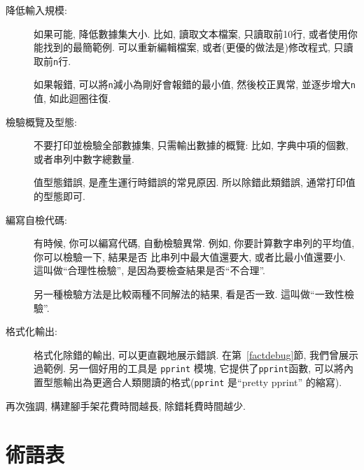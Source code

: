 \documentclass[10pt]{book}
\begin{document}
\begin{description}

\item[降低輸入規模:] 如果可能, 降低數據集大小. 比如, 讀取文本檔案, 
只讀取前10行, 或者使用你能找到的最簡範例. 
可以重新編輯檔案, 或者(更優的做法是)修改程式, 只讀取前{\tt n}行. 

如果報錯, 可以將{\tt n}減小為剛好會報錯的最小值, 
然後校正異常, 並逐步增大{\tt n}值, 如此迴圈往復. 

\item[檢驗概覽及型態:] 不要打印並檢驗全部數據集, 只需輸出數據的概覽:
比如, 字典中項的個數, 或者串列中數字總數量. 

值型態錯誤, 是產生運行時錯誤的常見原因. 
所以除錯此類錯誤, 通常打印值的型態即可. 

\item[編寫自檢代碼:]  有時候, 你可以編寫代碼, 自動檢驗異常. 
例如, 你要計算數字串列的平均值, 你可以檢驗一下, 結果是否
比串列中最大值還要大, 或者比最小值還要小. 這叫做``合理性檢驗'', 
是因為要檢查結果是否``不合理''.  

另一種檢驗方法是比較兩種不同解法的結果, 看是否一致. 
這叫做``一致性檢驗''. 

\item[格式化輸出:] 格式化除錯的輸出, 可以更直觀地展示錯誤. 
在第~\ref{factdebug}節, 我們曾展示過範例. 另一個好用的工具是 {\tt pprint} 模塊, 
它提供了{\tt pprint}函數, 可以將內置型態輸出為更適合人類閱讀的格式({\tt pprint}
是``pretty pprint'' 的縮寫).

\end{description}

再次強調, 構建腳手架花費時間越長, 除錯耗費時間越少. 


\section{術語表}
\end{document}
